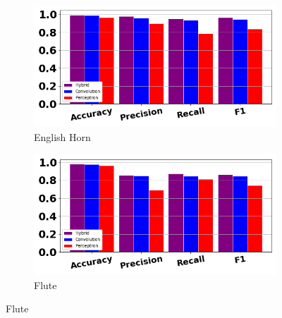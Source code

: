 \documentclass[12pt,letterpaper]{article}
\begin{document}
\begin{figure}[H]
	\begin{subfigure}[b]{0.45\textwidth}
	\centering
	\includegraphics[width=\textwidth]{../FiguresClasses/EnglishHorn}
	\caption{English Horn}
	\end{subfigure}	
	\hfill
	\begin{subfigure}[b]{0.45\textwidth}
	\centering
	\includegraphics[width=\textwidth]{../FiguresClasses/Flute}
	\caption{Flute}
	\end{subfigure}	
	

\end{figure}
\end{document}
